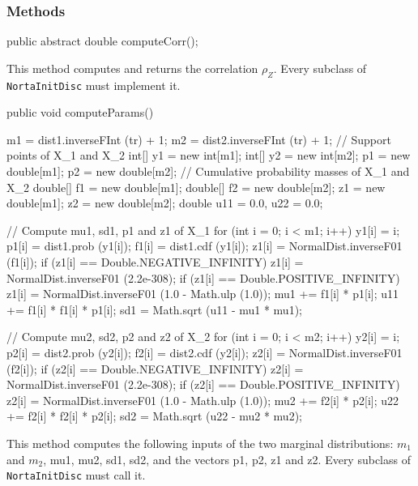 \subsubsection* {Methods}
\begin{code}

   public abstract double computeCorr();
\end{code}
\begin{tabb} This method computes and returns the correlation $\rho_Z$.
     Every subclass of \texttt{NortaInitDisc} must implement it.
\end{tabb}
\begin{code}

   public void computeParams() \begin{hide}
   {
      m1 = dist1.inverseFInt (tr) + 1;
      m2 = dist2.inverseFInt (tr) + 1;
      // Support points of X_1 and X_2
      int[] y1 = new int[m1];
      int[] y2 = new int[m2];
      p1 = new double[m1];
      p2 = new double[m2];
      // Cumulative probability masses of X_1 and X_2
      double[] f1 = new double[m1];
      double[] f2 = new double[m2];
      z1 = new double[m1];
      z2 = new double[m2];
      double u11 = 0.0, u22 = 0.0;

      // Compute mu1, sd1, p1 and z1 of X_1
      for (int i = 0; i < m1; i++) {
         y1[i] = i;
         p1[i] = dist1.prob (y1[i]);
         f1[i] = dist1.cdf (y1[i]);
         z1[i] = NormalDist.inverseF01 (f1[i]);
         if (z1[i] == Double.NEGATIVE_INFINITY)
            z1[i] = NormalDist.inverseF01 (2.2e-308);
         if (z1[i] == Double.POSITIVE_INFINITY)
            z1[i] = NormalDist.inverseF01 (1.0 - Math.ulp (1.0));
         mu1 += f1[i] * p1[i];
         u11 += f1[i] * f1[i] * p1[i];
      }
      sd1 = Math.sqrt (u11 - mu1 * mu1);

      // Compute mu2, sd2, p2 and z2 of X_2
      for (int i = 0; i < m2; i++) {
         y2[i] = i;
         p2[i] = dist2.prob (y2[i]);
         f2[i] = dist2.cdf (y2[i]);
         z2[i] = NormalDist.inverseF01 (f2[i]);
         if (z2[i] == Double.NEGATIVE_INFINITY)
            z2[i] = NormalDist.inverseF01 (2.2e-308);
         if (z2[i] == Double.POSITIVE_INFINITY)
            z2[i] = NormalDist.inverseF01 (1.0 - Math.ulp (1.0));
         mu2 += f2[i] * p2[i];
         u22 += f2[i] * f2[i] * p2[i];
      }
      sd2 = Math.sqrt (u22 - mu2 * mu2);
   }\end{hide}
\end{code}
\begin{tabb}  This method computes the following inputs of the two
    marginal distributions: $m_1$ and $m_2$, mu1, mu2, sd1, sd2, and the vectors
     p1, p2, z1 and z2. Every subclass of \texttt{NortaInitDisc} must call it.
\end{tabb}
